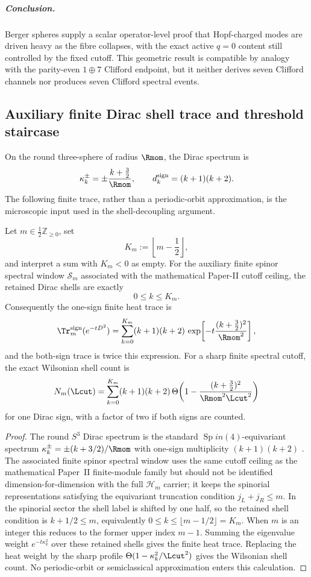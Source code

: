 \documentclass[11pt,a4paper]{article}
\begin{document}
\subparagraph{Conclusion.}
Berger spheres supply a scalar operator-level proof that Hopf-charged modes are driven heavy
as the fibre collapses, with the exact active \(q=0\) content still controlled
by the fixed cutoff.  This geometric result is compatible by analogy with the
parity-even \(1\oplus7\) Clifford endpoint, but it neither derives seven
Clifford channels nor produces seven Clifford spectral events.


\subsection{Auxiliary finite Dirac shell trace and threshold staircase}
\label{p3c:app:aux-dirac-windows}

On the round three-sphere of radius \(\Rmom\), the Dirac spectrum is
\[
\kappa_k^\pm=\pm\frac{k+\frac32}{\Rmom},
\qquad
 d_k^{\rm sign}=(k+1)(k+2).
\]
The following finite trace, rather than a periodic-orbit approximation, is the
microscopic input used in the shell-decoupling argument.

\begin{theorem}
\label{p3:thm:exact-fuzzy-s3-shell-trace}
Let \(m\in\tfrac12\mathbb Z_{\ge0}\), set
\[
 K_m:=\left\lfloor m-\frac12\right\rfloor,
\]
and interpret a sum with \(K_m<0\) as empty.  For the auxiliary finite spinor spectral
window \(\mathcal S_m\) associated with the mathematical Paper-II cutoff ceiling, the
retained Dirac shells are exactly
\[
0\le k\le K_m.
\]
Consequently the one-sign finite heat trace is
\[
\Tr_m^{\rm sign}(e^{-tD^2})
=
\sum_{k=0}^{K_m}(k+1)(k+2)\,
\exp\!\left[-t\frac{(k+\frac32)^2}{\Rmom^2}\right],
\]
and the both-sign trace is twice this expression.  For a sharp finite spectral cutoff, the exact Wilsonian shell count is
\[
N_m(\Lcut)
=
\sum_{k=0}^{K_m}(k+1)(k+2)\,
\Theta\!\left(1-\frac{(k+\frac32)^2}{\Rmom^2\Lcut^2}\right)
\]
for one Dirac sign, with a factor of two if both signs are counted.
\end{theorem}

\begin{proof}
The round \(S^3\) Dirac spectrum is the standard \(\operatorname{Sp}in(4)\)-equivariant spectrum
\(\kappa_k^\pm=\pm(k+3/2)/\Rmom\) with one-sign multiplicity
\((k+1)(k+2)\) \cite{CamporesiHiguchi1996}.  The associated finite spinor spectral window uses the same cutoff ceiling as the mathematical Paper~II finite-module family but should not be identified dimension-for-dimension with the full \(\mathcal H_m\) carrier; it keeps the spinorial representations satisfying the equivariant truncation condition
\(j_L+j_R\le m\).  In the spinorial sector the shell label is shifted by one half, so the retained
shell condition is \(k+1/2\le m\), equivalently
\(0\le k\le\lfloor m-1/2\rfloor=K_m\).  When \(m\) is an integer this reduces
to the former upper index \(m-1\).  Summing the eigenvalue weight
\(e^{-t\kappa_k^2}\) over these retained shells gives the finite heat trace.  Replacing the heat weight
by the sharp profile \(\Theta(1-\kappa_k^2/\Lcut^2)\) gives the Wilsonian shell count.  No periodic-orbit
or semiclassical approximation enters this calculation.
\end{proof}
\end{document}

